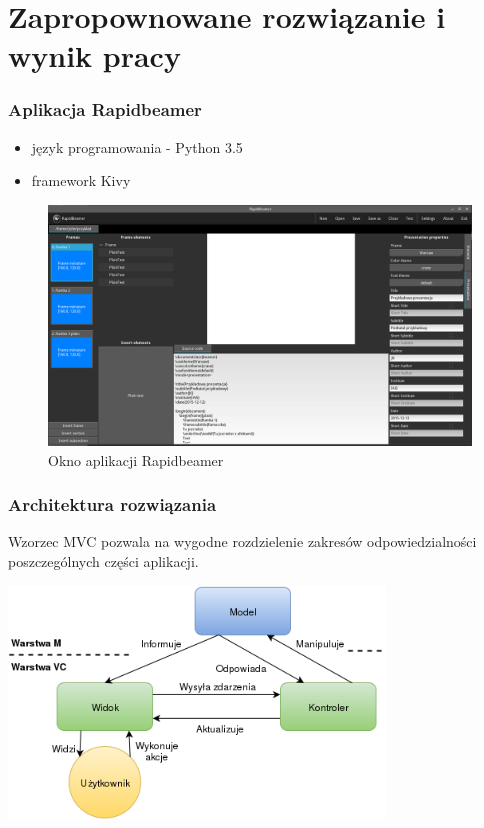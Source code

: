 \documentclass[t]{beamer}
\begin{document}
\section{Zapropownowane rozwiązanie i wynik pracy}

\begin{frame}
	\frametitle{Aplikacja Rapidbeamer}
	\begin{itemize}
		\item język programowania - Python 3.5
		\item framework Kivy
	\end{itemize}
	\begin{figure}[htp]
		\centering
		\includegraphics[width=.80\textwidth]{rapidbeamer.png}
		\caption{Okno aplikacji Rapidbeamer}
		\label{rbm}
	\end{figure}
\end{frame}

\begin{frame}
	\frametitle{Architektura rozwiązania}
	Wzorzec MVC pozwala na wygodne rozdzielenie zakresów odpowiedzialności poszczególnych części aplikacji.\\
	\begin{center}
		\includegraphics[width=0.75\textwidth]{mvc.png}
	\end{center}
\end{frame}
\end{document}
